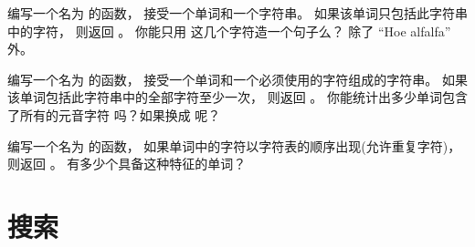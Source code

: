 \begin{exercise}


编写一个名为 {\em {}} 的函数， 接受一个单词和一个字符串。
如果该单词只包括此字符串中的字符， 则返回 {\em {}}。
你能只用 {\em {}} 这几个字符造一个句子么？ 除了 ``Hoe alfalfa'' 外。

\end{exercise}


\begin{exercise}


编写一个名为 {\em {}} 的函数， 接受一个单词和一个必须使用的字符组成的字符串。
如果该单词包括此字符串中的全部字符至少一次， 则返回 {\em {}}。
你能统计出多少单词包含了所有的元音字符 {\em {}}吗？如果换成 {\em {}} 呢？

\end{exercise}


\begin{exercise}


编写一个名为 {\em {}} 的函数， 如果单词中的字符以字符表的顺序出现(允许重复字符)， 则返回 {\em {}} 。
有多少个具备这种特征的单词？

  

\end{exercise}



\section{搜索}
\label{search}
  

